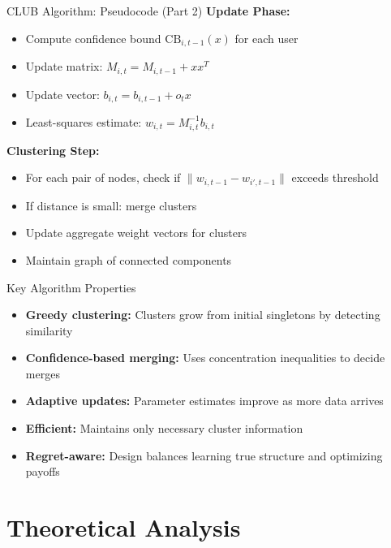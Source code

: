 \documentclass[11pt]{beamer}
\begin{document}
\begin{frame}{CLUB Algorithm: Pseudocode (Part 2)}
  \textbf{Update Phase:}
  \begin{itemize}
    \item Compute confidence bound $\text{CB}_{i,t-1}(x)$ for each user
    \item Update matrix: $M_{i,t} = M_{i,t-1} + x x^T$
    \item Update vector: $b_{i,t} = b_{i,t-1} + o_t x$
    \item Least-squares estimate: $w_{i,t} = M_{i,t}^{-1} b_{i,t}$
  \end{itemize}
  
  \textbf{Clustering Step:}
  \begin{itemize}
    \item For each pair of nodes, check if $\|w_{i,t-1} - w_{i',t-1}\|$ exceeds threshold
    \item If distance is small: merge clusters
    \item Update aggregate weight vectors for clusters
    \item Maintain graph of connected components
  \end{itemize}
\end{frame}

\begin{frame}{Key Algorithm Properties}
  \begin{itemize}
    \item \textbf{Greedy clustering:} Clusters grow from initial singletons by detecting similarity
    \item \textbf{Confidence-based merging:} Uses concentration inequalities to decide merges
    \item \textbf{Adaptive updates:} Parameter estimates improve as more data arrives
    \item \textbf{Efficient:} Maintains only necessary cluster information
    \item \textbf{Regret-aware:} Design balances learning true structure and optimizing payoffs
  \end{itemize}
\end{frame}

\section{Theoretical Analysis}
\end{document}

